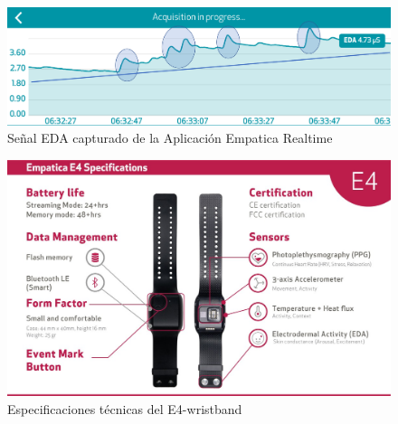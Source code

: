 \begin{figure}[h]
    \centering
    \includegraphics[width=15cm]{Graficos/new_EDA_figure.png}
    \caption{ Señal EDA capturado de la Aplicación Empatica Realtime}
    \label{fig:src}
\end{figure}

\begin{figure}[h]
    \centering
    \includegraphics[width=15cm]{Graficos/e4specs.jpg}
    \caption{ Especificaciones técnicas del E4-wristband}
    \label{fig:relo}
\end{figure}

    
    
    